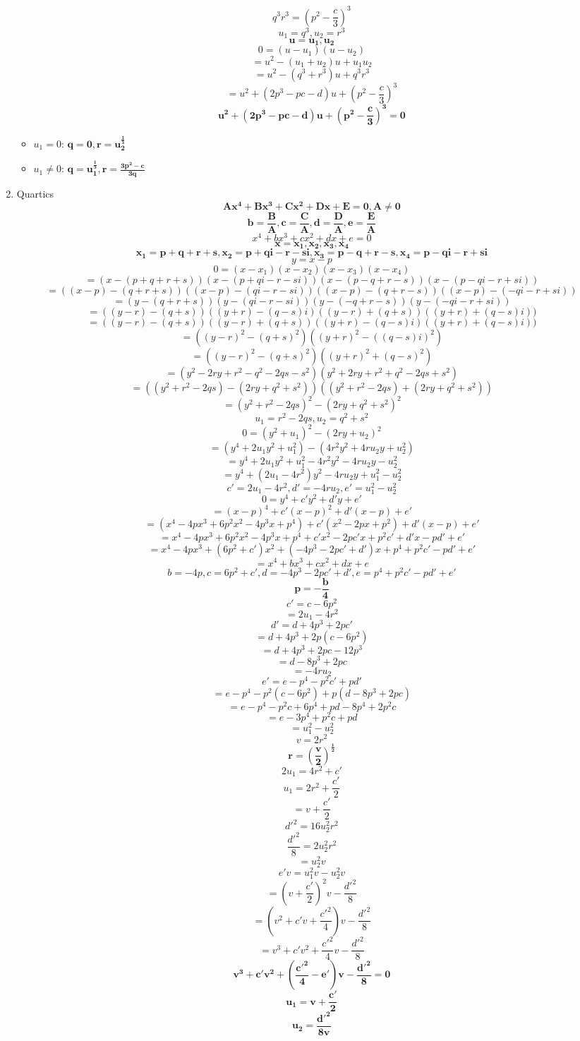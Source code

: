 \documentclass{article}
\begin{document}
\begin{enumerate}
  \[q^3r^3=\left(p^2-\frac{c}{3}\right)^3\]
  \[u_1=q^3, u_2=r^3\]
  \[\bm{u=u_1, u_2}\]
  \[0=(u-u_1)(u-u_2)\]
  \[=u^2-(u_1+u_2)u+u_1u_2\]
  \[=u^2-(q^3+r^3)u+q^3r^3\]
  \[=u^2+(2p^3-pc-d)u+\left(p^2-\frac{c}{3}\right)^3\]
  \[\bm{u^2+(2p^3-pc-d)u+\left(p^2-\frac{c}{3}\right)^3=0}\]
  \begin{itemize}
  \item $u_1=0$: $\bm{q=0, r=u_2^\frac{1}{3}}$
  \item $u_1\neq0$: $\bm{q=u_1^\frac{1}{3}, r=\frac{3p^2-c}{3q}}$
  \end{itemize}
  \newpage
\item Quartics
  \[\bm{Ax^4+Bx^3+Cx^2+Dx+E=0, A\neq0}\]
  \[\bm{b=\frac{B}{A}, c=\frac{C}{A}, d=\frac{D}{A}, e=\frac{E}{A}}\]
  \[x^4+bx^3+cx^2+dx+e=0\]
  \[\bm{x=x_1,x_2,x_3,x_4}\]
  \[\bm{x_1=p+q+r+s, x_2=p+qi-r-si, x_3=p-q+r-s, x_4=p-qi-r+si}\]
  \[y=x-p\]
  \[0=(x-x_1)(x-x_2)(x-x_3)(x-x_4)\]
  \[=(x-(p+q+r+s))(x-(p+qi-r-si))(x-(p-q+r-s))(x-(p-qi-r+si))\]
  \[=((x-p)-(q+r+s))((x-p)-(qi-r-si))((x-p)-(q+r-s))((x-p)-(-qi-r+si))\]
  \[=(y-(q+r+s))(y-(qi-r-si))(y-(-q+r-s))(y-(-qi-r+si))\]
  \[=((y-r)-(q+s))((y+r)-(q-s)i)((y-r)+(q+s))((y+r)+(q-s)i))\]
  \[=((y-r)-(q+s))((y-r)+(q+s))((y+r)-(q-s)i)((y+r)+(q-s)i))\]
  \[=((y-r)^2-(q+s)^2)((y+r)^2-((q-s)i)^2)\]
  \[=((y-r)^2-(q+s)^2)((y+r)^2+(q-s)^2)\]
  \[=(y^2-2ry+r^2-q^2-2qs-s^2)(y^2+2ry+r^2+q^2-2qs+s^2)\]
  \[=((y^2+r^2-2qs)-(2ry+q^2+s^2))((y^2+r^2-2qs)+(2ry+q^2+s^2))\]
  \[=(y^2+r^2-2qs)^2-(2ry+q^2+s^2)^2\]
  \[u_1=r^2-2qs, u_2=q^2+s^2\]
  \[0=(y^2+u_1)^2-(2ry+u_2)^2\]
  \[=(y^4+2u_1y^2+u_1^2)-(4r^2y^2+4ru_2y+u_2^2)\]
  \[=y^4+2u_1y^2+u_1^2-4r^2y^2-4ru_2y-u_2^2\]
  \[=y^4+(2u_1-4r^2)y^2-4ru_2y+u_1^2-u_2^2\]
  \[c'=2u_1-4r^2, d'=-4ru_2, e'=u_1^2-u_2^2\]
  \[0=y^4+c'y^2+d'y+e'\]
  \[=(x-p)^4+c'(x-p)^2+d'(x-p)+e'\]
  \[=(x^4-4px^3+6p^2x^2-4p^3x+p^4)+c'(x^2-2px+p^2)+d'(x-p)+e'\]
  \[=x^4-4px^3+6p^2x^2-4p^3x+p^4+c'x^2-2pc'x+p^2c'+d'x-pd'+e'\]
  \[=x^4-4px^3+(6p^2+c')x^2+(-4p^3-2pc'+d')x+p^4+p^2c'-pd'+e'\]
  \[=x^4+bx^3+cx^2+dx+e\]
  \[b=-4p, c=6p^2+c', d=-4p^3-2pc'+d', e=p^4+p^2c'-pd'+e'\]
  \[\bm{p=-\frac{b}{4}}\]
  \[c'=c-6p^2\]
  \[=2u_1-4r^2\]
  \[d'=d+4p^3+2pc'\]
  \[=d+4p^3+2p(c-6p^2)\]
  \[=d+4p^3+2pc-12p^3\]
  \[=d-8p^3+2pc\]
  \[=-4ru_2\]
  \[e'=e-p^4-p^2c'+pd'\]
  \[=e-p^4-p^2(c-6p^2)+p(d-8p^3+2pc)\]
  \[=e-p^4-p^2c+6p^4+pd-8p^4+2p^2c\]
  \[=e-3p^4+p^2c+pd\]
  \[=u_1^2-u_2^2\]
  \[v=2r^2\]
  \[\bm{r=(\frac{v}{2})^\frac{1}{2}}\]
  \[2u_1=4r^2+c'\]
  \[u_1=2r^2+\frac{c'}{2}\]
  \[=v+\frac{c'}{2}\]
  \[d'^2=16u_2^2r^2\]
  \[\frac{d'^2}{8}=2u_2^2r^2\]
  \[=u_2^2v\]
  \[e'v=u_1^2v-u_2^2v\]
  \[=(v+\frac{c'}{2})^2v-\frac{d'^2}{8}\]
  \[=(v^2+c'v+\frac{c'^2}{4})v-\frac{d'^2}{8}\]
  \[=v^3+c'v^2+\frac{c'^2}{4}v-\frac{d'^2}{8}\]
  \[\bm{v^3+c'v^2+(\frac{c'^2}{4}-e')v-\frac{d'^2}{8}=0}\]
  \[\bm{u_1=v+\frac{c'}{2}}\]
  \[\bm{u_2=\frac{d'^2}{8v}}\]
\end{enumerate}
\end{document}
